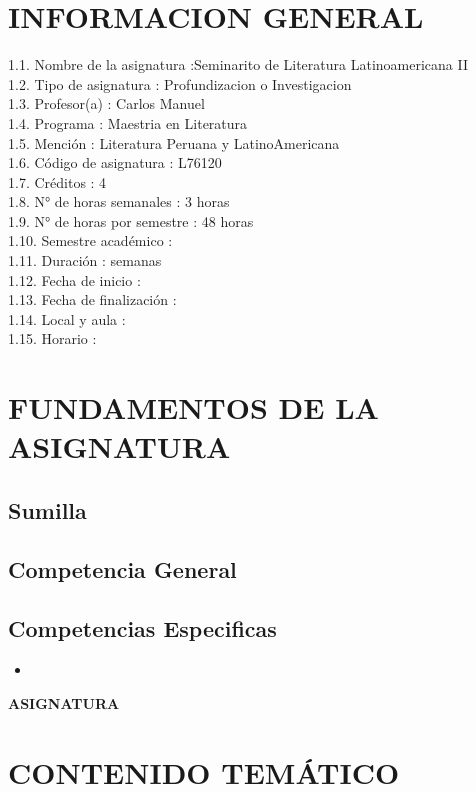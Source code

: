 \documentclass[a4paper]{article}
\begin{document}
\section{INFORMACION GENERAL}
1.1. Nombre de la asignatura :Seminarito de Literatura Latinoamericana II \\ 
1.2. Tipo de asignatura : Profundizacion o Investigacion \\ 
1.3. Profesor(a) : Carlos Manuel  \\ 
1.4. Programa : Maestria en Literatura \\ 
1.5. Mención : Literatura Peruana y LatinoAmericana \\ 
1.6. Código de asignatura : L76120 \\ 
1.7. Créditos : 4  \\ 
1.8. N° de horas semanales : 3 horas \\ 
1.9. N° de horas por semestre : 48 horas \\ 
1.10. Semestre académico :  \\ 
1.11. Duración :  semanas \\ 
1.12. Fecha de inicio :  \\ 
1.13. Fecha de finalización :  \\ 
1.14. Local y aula :  \\ 
1.15. Horario :  \\ 
\section{FUNDAMENTOS DE LA ASIGNATURA}
\subsection{Sumilla}

\subsection{Competencia General}

\subsection{Competencias Especificas}
\begin{itemize}
\item 
\end{itemize}
\newpage
\begin{flushleft}
{\huge \bf ASIGNATURA}\\[0.3cm]
\end{flushleft}
\section{CONTENIDO TEMÁTICO}
\end{document}
